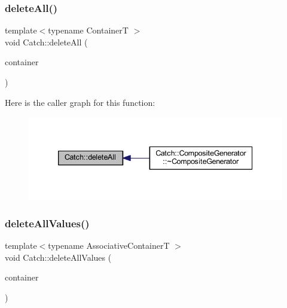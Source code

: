 \hypertarget{namespace_catch_aadf9786550a462740ec355f8219863a9}{}\label{namespace_catch_aadf9786550a462740ec355f8219863a9} 
\subsubsection{\texorpdfstring{delete\+All()}{deleteAll()}}
{\footnotesize\ttfamily template$<$typename ContainerT $>$ \\
void Catch\+::delete\+All (\begin{DoxyParamCaption}\item[{ContainerT \&}]{container }\end{DoxyParamCaption})\hspace{0.3cm}{\ttfamily [inline]}}

Here is the caller graph for this function\+:\nopagebreak
\begin{figure}[H]
\begin{center}
\leavevmode
\includegraphics[width=339pt]{namespace_catch_aadf9786550a462740ec355f8219863a9_icgraph}
\end{center}
\end{figure}
\hypertarget{namespace_catch_af2fcec1d4bd984fe19ff8b9a432c36a8}{}\label{namespace_catch_af2fcec1d4bd984fe19ff8b9a432c36a8} 
\subsubsection{\texorpdfstring{delete\+All\+Values()}{deleteAllValues()}}
{\footnotesize\ttfamily template$<$typename Associative\+ContainerT $>$ \\
void Catch\+::delete\+All\+Values (\begin{DoxyParamCaption}\item[{Associative\+ContainerT \&}]{container }\end{DoxyParamCaption})\hspace{0.3cm}{\ttfamily [inline]}}

